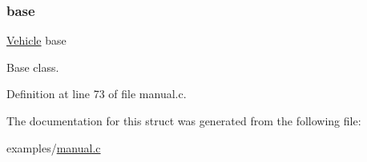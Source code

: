 \subsubsection{\texorpdfstring{base}{base}}
{\footnotesize\ttfamily \hyperlink{struct_vehicle}{Vehicle} base\hspace{0.3cm}{\ttfamily [protected]}}



Base class. 



Definition at line 73 of file manual.\+c.



The documentation for this struct was generated from the following file\+:\begin{DoxyCompactItemize}
\item 
examples/\hyperlink{manual_8c}{manual.\+c}\end{DoxyCompactItemize}
